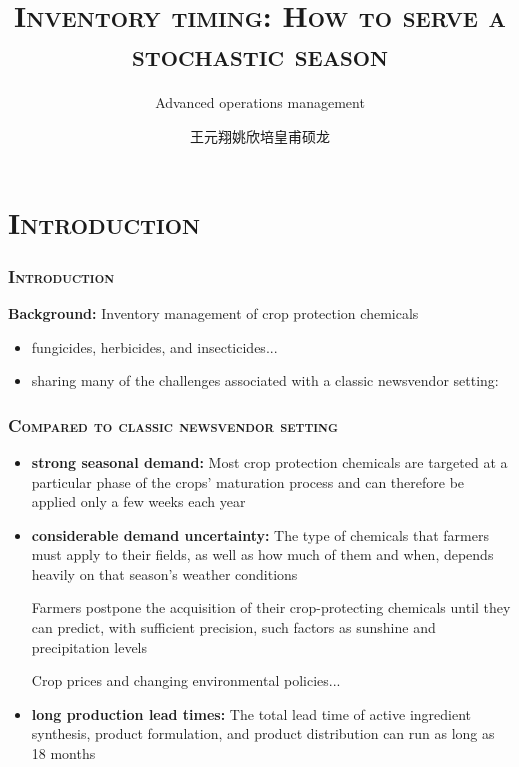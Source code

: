 \documentclass[aspectratio=169]{../presentation}
\title{\textsc{Inventory timing: How to serve a stochastic season}}
\subtitle{Advanced operations management}
\author{王元翔\;姚欣培\;皇甫硕龙}
\begin{document}
    \small
    \begin{frame}
        \maketitle
    \end{frame}

    \section{\textsc{Introduction}}

    \begin{frame}
        \frametitle{\textsc{Introduction}}

        \textbf{Background:} Inventory management of crop protection chemicals

        \begin{itemize}
            \item fungicides, herbicides, and insecticides...
            \item sharing many of the challenges associated with a classic newsvendor setting:
        \end{itemize}

    \end{frame}
    \begin{frame}
        \frametitle{\textsc{Compared to classic newsvendor setting}}

        \begin{itemize}
            \item \textbf{strong seasonal demand: }Most crop protection chemicals are targeted at a particular phase of the crops' maturation process and can therefore be applied only a few weeks each year
            \item \textbf{considerable demand uncertainty: } The type of chemicals that farmers must apply to their fields, as well as how much of them and when, depends heavily on that season's weather conditions

            Farmers postpone the acquisition of their crop-protecting chemicals until they can predict, with sufficient precision, such factors as sunshine and precipitation levels

            Crop prices and changing environmental policies...

            \item \textbf{long production lead times: } The total lead time of active ingredient synthesis, product formulation, and product distribution can run as long as 18 months
        \end{itemize}
    \end{frame}
\end{document}
